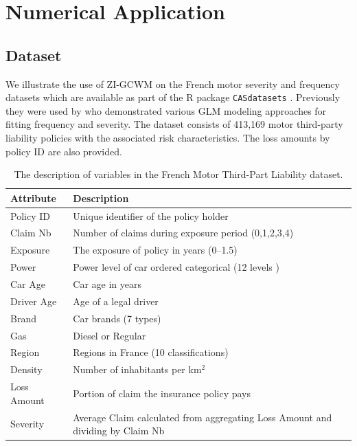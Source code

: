 \documentclass[12pt,letterpaper]{article}
\numberwithin{equation}{section}
\numberwithin{equation}{section}
\numberwithin{equation}{section}
\begin{document}
\section{Numerical Application}\label{sec:numapp}
\subsection{Dataset}
We illustrate the use of ZI-GCWM on the French motor severity and frequency datasets which are available as part of the {\sf R} package {\tt CASdatasets} \citep{Dutang+Charpentier:2016}. Previously they were used by \cite{Charpentier:2014} who demonstrated various GLM modeling approaches for fitting frequency and severity. 
The dataset consists of 413,169 motor third-party liability policies with the associated risk characteristics. The loss amounts by policy ID are also provided. 

\begin{small}
\begin{table}[!htb]
\begin{center}
    \caption{The description of variables in the French Motor Third-Part Liability dataset.}
      \centering
        \begin{tabular}{ll}
\hline
Attribute & Description \\
\hline
Policy ID & Unique identifier of the policy holder\\
Claim Nb & Number of claims during exposure period  (0,1,2,3,4)\\
Exposure & The exposure of policy in years (0--1.5) \\
Power & Power level of car ordered categorical (12 levels )\\
Car Age & Car age in years \\
Driver Age & Age of a legal driver \\
Brand & Car brands (7 types) \\
Gas & Diesel or Regular \\
Region & Regions in France (10 classifications)\\
Density & Number of inhabitants per km$^2$ \\
Loss Amount & Portion of claim the insurance policy pays\\
Severity & Average Claim calculated from aggregating Loss Amount and dividing by Claim Nb \\
\hline
		\end{tabular}
\end{center}
\end{table}
\end{small}
\end{document}
